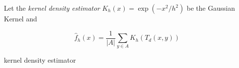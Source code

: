 Let the \textit{ kernel density estimator} $K_h(x) = \exp( -x^2/h^2)$ be the Gaussian Kernel and

\[   \hat{f}_h(x) = \frac{1}{|A|}\sum_{ y \in A} K_h (T_d(x,y))  \]

 kernel density estimator

